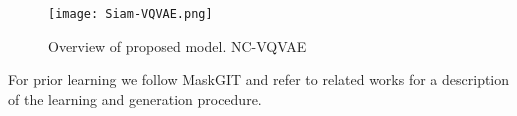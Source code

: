 \documentclass[../../thesis.tex]{subfiles}
\begin{document}
\begin{figure}[h]
    \label{fig:NC-VQVAE}
    \texttt{[image: Siam-VQVAE.png]}
    \centering  
    \caption{Overview of proposed model. NC-VQVAE}
\end{figure}

For prior learning we follow MaskGIT and refer to related works for a description of the learning and generation procedure.






\end{document}
